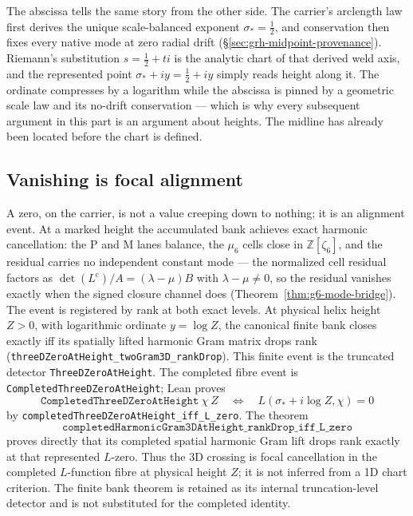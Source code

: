 The abscissa tells the same story from the other side.  The carrier's
arclength law first derives the unique scale-balanced exponent
\(\sigma_*=\tfrac12\), and conservation then fixes every native mode at zero
radial drift (\S\ref{sec:grh-midpoint-provenance}).  Riemann's substitution
\(s=\tfrac12+ti\) is the analytic chart of that derived weld axis, and the
represented point \(\sigma_*+iy=\tfrac12+iy\) simply reads height along it.
The ordinate compresses by a logarithm while the abscissa is pinned by a
geometric scale law and its no-drift conservation --- which is why every
subsequent argument in this part is an argument about heights.  The midline
has already been located before the chart is defined.

\subsection{Vanishing is focal alignment}\label{sec:grh-focal}

A zero, on the carrier, is not a value creeping down to nothing; it is an
alignment event. At a marked height the accumulated bank achieves exact
harmonic cancellation: the P and M lanes balance, the \(\mu_6\) cells close in
\(\mathbb Z[\zeta_6]\), and the residual carries no independent constant mode
--- the normalized cell residual factors as \(\det(L^{\mathrm c})/A=
(\lambda-\mu)B\) with \(\lambda-\mu\neq0\), so the residual vanishes exactly
when the signed closure channel does (Theorem~\ref{thm:g6-mode-bridge}).
The event is registered by rank at both exact levels.  At physical helix
height \(Z>0\), with logarithmic ordinate \(y=\log Z\), the canonical finite
bank closes exactly iff its spatially lifted harmonic Gram matrix drops rank
(\texttt{threeDZeroAtHeight\_twoGram3D\_rankDrop}).  This finite event is the
truncated detector \texttt{ThreeDZeroAtHeight}.  The completed fibre event is
\texttt{CompletedThreeDZeroAtHeight}; Lean proves
\[
 \texttt{CompletedThreeDZeroAtHeight}\ \chi\ Z
 \quad\Longleftrightarrow\quad
 L(\sigma_*+i\log Z,\chi)=0
\]
by \texttt{completedThreeDZeroAtHeight\_iff\_L\_zero}.  The theorem
\[
\texttt{completedHarmonicGram3DAtHeight\_rankDrop\_iff\_L\_zero}
\]
proves directly that its completed spatial harmonic Gram lift drops rank exactly at
that represented \(L\)-zero.  Thus the
3D crossing is focal cancellation in the completed \(L\)-function fibre at
physical height \(Z\); it is not inferred from a 1D chart criterion.  The
finite bank theorem is retained as its internal truncation-level detector and
is not substituted for the completed identity.


